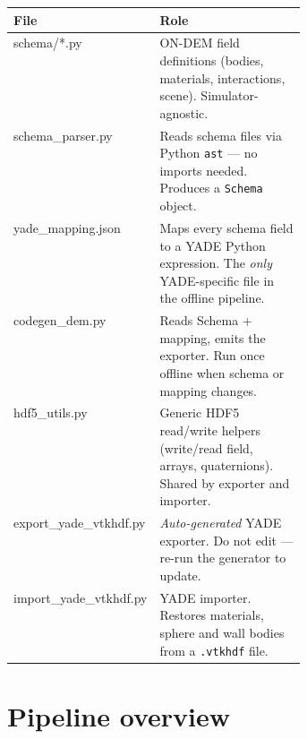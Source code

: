 \documentclass[10pt,a4paper]{article}
\begin{document}
\begin{tabularx}{\textwidth}{>{\ttfamily\small}p{0.38\linewidth}>{\small\raggedright\arraybackslash}X}
\toprule
\sffamily\textbf{File} & \sffamily\textbf{Role} \\
\midrule
schema/*.py            & ON-DEM field definitions (bodies, materials, interactions, scene). Simulator-agnostic. \\
schema\_parser.py      & Reads schema files via Python \texttt{ast} — no imports needed. Produces a \texttt{Schema} object. \\
yade\_mapping.json     & Maps every schema field to a YADE Python expression. The \emph{only} YADE-specific file in the offline pipeline. \\
codegen\_dem.py        & Reads Schema + mapping, emits the exporter. Run once offline when schema or mapping changes. \\
hdf5\_utils.py         & Generic HDF5 read/write helpers (write/read field, arrays, quaternions). Shared by exporter and importer. \\
export\_yade\_vtkhdf.py & \emph{Auto-generated} YADE exporter. Do not edit — re-run the generator to update. \\
import\_yade\_vtkhdf.py & YADE importer. Restores materials, sphere and wall bodies from a \texttt{.vtkhdf} file. \\
\bottomrule
\end{tabularx}

\section{Pipeline overview}
\end{document}
